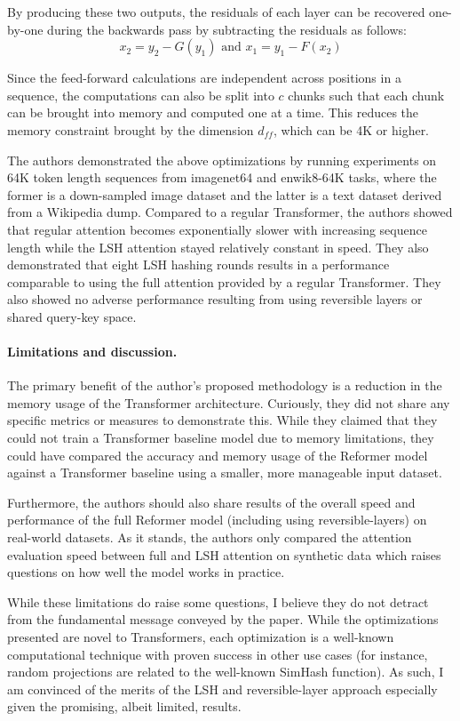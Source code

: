 \documentclass{article}
\begin{document}
By producing these two outputs, the residuals of each layer can be recovered one-by-one during the backwards pass by subtracting the residuals as follows:
$$
x_2 = y_2 - G(y_1) \text{ and } x_1 = y_1 - F(x_2)
$$

Since the feed-forward calculations are independent across positions in a sequence, the computations can also be split into $c$ chunks such that each chunk can be brought into memory and computed one at a time. This reduces the memory constraint brought by the dimension $d_{ff}$, which can be 4K or higher. 

The authors demonstrated the above optimizations by running experiments on 64K token length sequences from imagenet64 and enwik8-64K tasks, where the former is a down-sampled image dataset and the latter is a text dataset derived from a Wikipedia dump. Compared to a regular Transformer, the authors showed that regular attention becomes exponentially slower with increasing sequence length while the LSH attention stayed relatively constant in speed. They also demonstrated that eight LSH hashing rounds results in a performance comparable to using the full attention provided by a regular Transformer. They also showed no adverse performance resulting from using reversible layers or shared query-key space. 


\paragraph{Limitations and discussion.}

The primary benefit of the author’s proposed methodology is a reduction in the memory usage of the Transformer architecture. Curiously, they did not share any specific metrics or measures to demonstrate this. While they claimed that they could not train a Transformer baseline model due to memory limitations, they could have compared the accuracy and memory usage of the Reformer model against a Transformer baseline using a smaller, more manageable input dataset. 

Furthermore, the authors should also share results of the overall speed and performance of the full Reformer model (including using reversible-layers) on real-world datasets. As it stands, the authors only compared the attention evaluation speed between full and LSH attention on synthetic data which raises questions on how well the model works in practice. 

While these limitations do raise some questions, I believe they do not detract from the fundamental message conveyed by the paper. While the optimizations presented are novel to Transformers, each optimization is a well-known computational technique with proven success in other use cases (for instance, random projections are related to the well-known SimHash function). As such, I am convinced of the merits of the LSH and reversible-layer approach especially given the promising, albeit limited, results.
\end{document}
